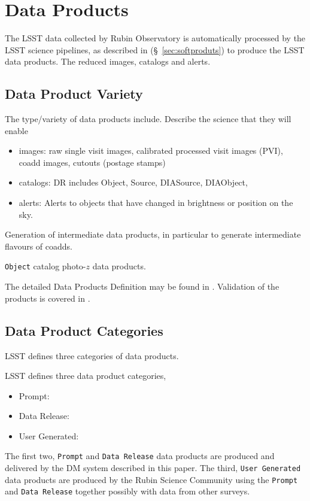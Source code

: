 \section{Data Products} \label{sec:dataproducts}

The LSST data collected by Rubin Observatory is automatically processed by the LSST science pipelines, as described in (\S~\ref{sec:softproduts})  to produce the LSST data products. The  reduced images, catalogs and alerts. 

\subsection{Data Product  Variety} 
The type/variety of data products include. Describe the science that they will enable 
\begin{itemize}
\item images:  raw single visit images, calibrated processed visit images (PVI), coadd images, cutouts (postage stamps) 
\item catalogs: DR includes Object, Source, DIASource, DIAObject, 
\item alerts: Alerts to objects that have changed in brightness or position on the sky. 
\end{itemize}



Generation of intermediate data products, in particular to generate intermediate flavours of coadds. 

{\tt Object} catalog photo-$z$ data products.


 The detailed  Data Products Definition may be found in  \cite{LSE-163}.
Validation of the products is covered in \cite{PSTN-024}.

\subsection{Data Product Categories} 
LSST defines three categories of data products. 

LSST defines three data product categories,
\begin{itemize}
\item Prompt: 
\item Data Release: 
\item User Generated: 
\end{itemize}
The first two, {\tt Prompt} and {\tt Data Release} data products are produced and delivered by the DM system described in this paper. 
The third, {\tt User Generated} data products are produced by the Rubin Science Community using the {\tt Prompt} and {\tt Data Release} together possibly with data from other surveys. 


